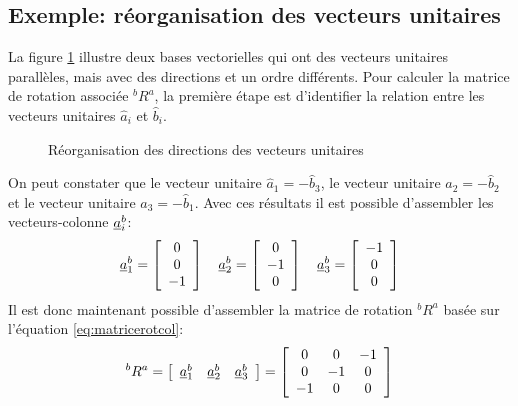 \subsection{Exemple: réorganisation des vecteurs unitaires}
%
La figure \ref{fig:r_reorg} illustre deux bases vectorielles qui ont des vecteurs unitaires parallèles, mais avec des directions et un ordre différents. Pour calculer la matrice de rotation associée $^bR^a$, la première étape est d'identifier la relation entre les vecteurs unitaires $\hat{a}_i$ et $\hat{b}_i$.
%
\begin{figure}[H]
	\centering
	\hspace{20pt}
	\hspace{20pt}
	\caption{Réorganisation des directions des vecteurs unitaires}
	\label{fig:r_reorg}
\end{figure}
%
On peut constater que le vecteur unitaire $\hat{a}_1=-\hat{b}_3$, le vecteur unitaire $\hat{a}_2=-\hat{b}_2$ et le vecteur unitaire $\hat{a}_3=-\hat{b}_1$. Avec ces résultats il est possible d'assembler les vecteurs-colonne $\underline{a}_i^b$:
\begin{align}
	\underline{a}_1^b = \left[ \begin{array}{c} 0 \\ 0 \\ -1  \end{array} \right] \quad
	\underline{a}_2^b = \left[ \begin{array}{c} 0 \\ -1 \\ 0 \end{array} \right] \quad
	\underline{a}_3^b = \left[ \begin{array}{c} -1 \\ 0 \\ 0   \end{array} \right]
\end{align}
Il est donc maintenant possible d'assembler la matrice de rotation $^bR^a$ basée sur l'équation \eqref{eq:matricerotcol}:
\begin{align}
	^bR^a =\left[ \begin{array}{c c c}
					  \underline{a}_1^b  & \underline{a}_2^b & \underline{a}_3^b
	\end{array}  \right]
	= \left[ \begin{array}{c c c}
				 0 & 0 & -1 \\
				 0 & -1 & 0 \\
				 -1 & 0 & 0
	\end{array}  \right]
\end{align}




